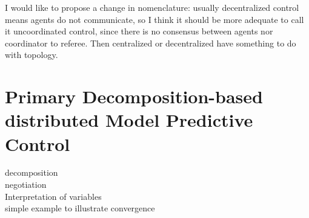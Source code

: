 \documentclass[../main.tex]{subfiles}
\begin{document}
\begin{remark}
  I would like to propose a change in nomenclature: usually decentralized control means agents do not communicate, so I think it should be more adequate to call it uncoordinated control, since there is no consensus between agents nor coordinator to referee. Then centralized or decentralized have something to do with topology.
\end{remark}

\printbibliography%

\chapter{Primary Decomposition-based distributed Model Predictive Control}
\begin{description}
  \item[decomposition]
  \item[negotiation]
  \item[Interpretation of variables]
  \item[simple example to illustrate convergence]
\end{description}


\printbibliography%
\end{document}
